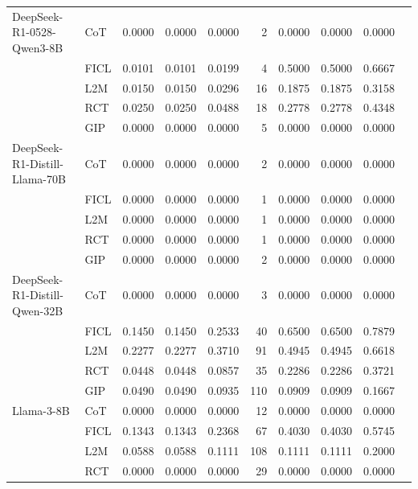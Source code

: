 \documentclass[conference]{IEEEtran}
\begin{document}
\begin{longtable}{p{3.5cm} l r r r r r r r r}
  \midrule
  \endfoot
DeepSeek-R1-0528-Qwen3-8B & CoT  & 0.0000 & 0.0000 & 0.0000 & 2 & 0.0000 & 0.0000 & 0.0000 \\
                          & FICL & 0.0101 & 0.0101 & 0.0199 & 4 & 0.5000 & 0.5000 & 0.6667 \\
                          & L2M  & 0.0150 & 0.0150 & 0.0296 & 16 & 0.1875 & 0.1875 & 0.3158 \\
                          & RCT  & 0.0250 & 0.0250 & 0.0488 & 18 & 0.2778 & 0.2778 & 0.4348 \\
                          & GIP  & 0.0000 & 0.0000 & 0.0000 & 5 & 0.0000 & 0.0000 & 0.0000 \\ \addlinespace
DeepSeek-R1-Distill-Llama-70B & CoT  & 0.0000 & 0.0000 & 0.0000 & 2 & 0.0000 & 0.0000 & 0.0000 \\
                          & FICL & 0.0000 & 0.0000 & 0.0000 & 1 & 0.0000 & 0.0000 & 0.0000 \\
                          & L2M  & 0.0000 & 0.0000 & 0.0000 & 1 & 0.0000 & 0.0000 & 0.0000 \\
                          & RCT  & 0.0000 & 0.0000 & 0.0000 & 1 & 0.0000 & 0.0000 & 0.0000 \\
                          & GIP  & 0.0000 & 0.0000 & 0.0000 & 2 & 0.0000 & 0.0000 & 0.0000 \\ \addlinespace
DeepSeek-R1-Distill-Qwen-32B & CoT  & 0.0000 & 0.0000 & 0.0000 & 3 & 0.0000 & 0.0000 & 0.0000 \\
                          & FICL & 0.1450 & 0.1450 & 0.2533 & 40 & 0.6500 & 0.6500 & 0.7879 \\
                          & L2M  & 0.2277 & 0.2277 & 0.3710 & 91 & 0.4945 & 0.4945 & 0.6618 \\
                          & RCT  & 0.0448 & 0.0448 & 0.0857 & 35 & 0.2286 & 0.2286 & 0.3721 \\
                          & GIP  & 0.0490 & 0.0490 & 0.0935 & 110 & 0.0909 & 0.0909 & 0.1667 \\ \addlinespace
Llama-3-8B & CoT  & 0.0000 & 0.0000 & 0.0000 & 12 & 0.0000 & 0.0000 & 0.0000 \\
           & FICL & 0.1343 & 0.1343 & 0.2368 & 67 & 0.4030 & 0.4030 & 0.5745 \\
           & L2M  & 0.0588 & 0.0588 & 0.1111 & 108 & 0.1111 & 0.1111 & 0.2000 \\
           & RCT  & 0.0000 & 0.0000 & 0.0000 & 29 & 0.0000 & 0.0000 & 0.0000 \\

\end{longtable}
\end{document}
